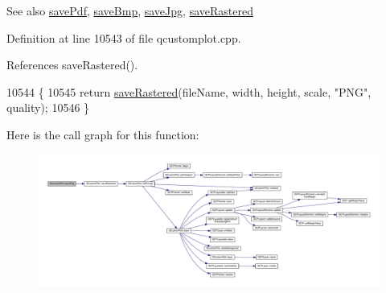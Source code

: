 \begin{DoxySeeAlso}{See also}
\hyperlink{class_q_custom_plot_a632da44c6d94ea8b271eb483b08b5114}{save\+Pdf}, \hyperlink{class_q_custom_plot_a6629d9e8e6da4bf18055ee0257fdce9a}{save\+Bmp}, \hyperlink{class_q_custom_plot_a490c722092d1771e8ce4a7a73dfd84ab}{save\+Jpg}, \hyperlink{class_q_custom_plot_ab528b84cf92baabe29b1d0ef2f77c93e}{save\+Rastered} 
\end{DoxySeeAlso}


Definition at line 10543 of file qcustomplot.\+cpp.



References save\+Rastered().


\begin{DoxyCode}
10544 \{
10545   \textcolor{keywordflow}{return} \hyperlink{class_q_custom_plot_ab528b84cf92baabe29b1d0ef2f77c93e}{saveRastered}(fileName, width, height, scale, \textcolor{stringliteral}{"PNG"}, quality);
10546 \}
\end{DoxyCode}


Here is the call graph for this function\+:\nopagebreak
\begin{figure}[H]
\begin{center}
\leavevmode
\includegraphics[width=350pt]{class_q_custom_plot_a7636261aff1f6d25c9da749ece3fc8b8_cgraph}
\end{center}
\end{figure}


\hypertarget{class_q_custom_plot_ab528b84cf92baabe29b1d0ef2f77c93e}{}
